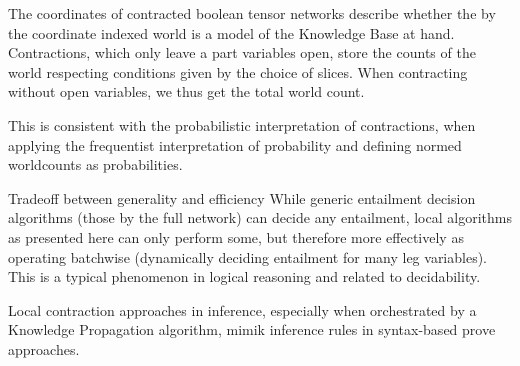
\begin{remark}
    The coordinates of contracted boolean tensor networks describe whether the by the coordinate indexed world is a model of the Knowledge Base at hand.
    Contractions, which only leave a part variables open, store the counts of the world respecting conditions given by the choice of slices.
    When contracting without open variables, we thus get the total world count.

    This is consistent with the probabilistic interpretation of contractions, when applying the frequentist interpretation of probability and defining normed worldcounts as probabilities.
\end{remark}


\begin{remark}{Tradeoff between generality and efficiency}
    While generic entailment decision algorithms (those by the full network) can decide any entailment, local algorithms as presented here can only perform some, but therefore more effectively as operating batchwise (dynamically deciding entailment for many leg variables).
    This is a typical phenomenon in logical reasoning and related to decidability.
\end{remark}

Local contraction approaches in inference, especially when orchestrated by a Knowledge Propagation algorithm, mimik inference rules in syntax-based prove approaches.
